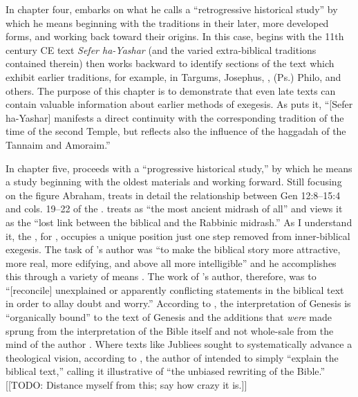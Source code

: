  In chapter four, \vermes embarks on what he calls a ``retrogressive historical study'' by which he means beginning with the traditions in their later, more developed forms, and working back toward their origins. In this case, \vermes begins with the 11th century CE text \emph{Sefer ha-Yashar} (and the varied extra-biblical traditions contained therein) then works backward to identify sections of the text which exhibit earlier traditions, for example, in Targums, Josephus, \jub, (Ps.) Philo, and others. The purpose of this chapter is to demonstrate that even late texts can contain valuable information about earlier methods of exegesis. As \vermes puts it, ``{[}Sefer ha-Yashar{]} manifests a direct continuity with the corresponding tradition of the time of the second Temple, but reflects also the influence of the haggadah of the Tannaim and Amoraim.''\autocite[95]{vermes1961} 

 In chapter five, \vermes proceeds with a ``progressive historical study,'' by which he means a study beginning with the oldest materials and working forward. Still focusing on the figure Abraham, \vermes treats in detail the relationship between Gen 12:8--15:4 and cols. 19--22 of the \ga. \vermes treats \ga as ``the most ancient midrash of all''\autocite[124]{vermes1961} and views it as the ``lost link between the biblical and the Rabbinic midrash.'' \autocite[124]{vermes1961} As I understand it, the \ga, for \vermes, occupies a unique position just one step removed from inner-biblical exegesis. The task of \ga's author was ``to make the biblical story more attractive, more real, more edifying, and above all more intelligible'' and he accomplishes this through a variety of means \autocite[125]{vermes1961}. The work of \ga's author, therefore, was to ``{[}reconcile{]} unexplained or apparently conflicting statements in the biblical text in order to allay doubt and worry.''\autocite[125]{vermes1961} According to \vermes, the interpretation of Genesis is ``organically bound'' to the text of Genesis and the additions that \emph{were} made sprung from the interpretation of the Bible itself and not whole-sale from the mind of the author \autocite[126]{vermes1961}. Where texts like Jubliees sought to systematically advance a theological vision, according to \vermes, the author of \ga intended to simply ``explain the biblical text,'' calling it illustrative of ``the unbiased rewriting of the Bible.''\autocite[126]{vermes1961} [[TODO: Distance myself from this; say how crazy it is.]]

